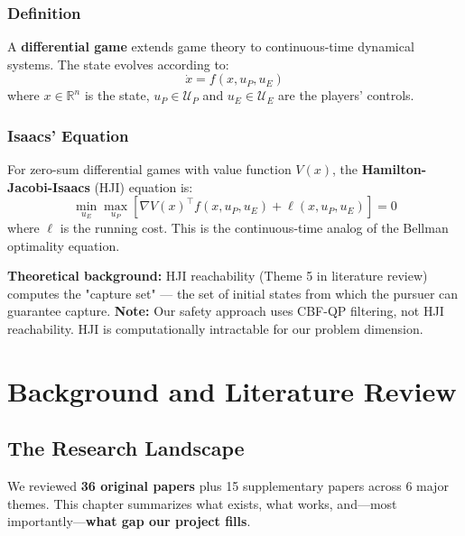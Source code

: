 \documentclass[11pt,a4paper]{report}
\begin{document}
\subsection{Definition}

A \textbf{differential game} extends game theory to continuous-time dynamical systems. The state evolves according to:
\begin{equation}
    \dot{x} = f(x, u_P, u_E)
\end{equation}
where $x \in \mathbb{R}^n$ is the state, $u_P \in \mathcal{U}_P$ and $u_E \in \mathcal{U}_E$ are the players' controls.

\subsection{Isaacs' Equation}

For zero-sum differential games with value function $V(x)$, the \textbf{Hamilton-Jacobi-Isaacs} (HJI) equation is:
\begin{equation}
    \min_{u_E} \max_{u_P} \left[ \nabla V(x)^\top f(x, u_P, u_E) + \ell(x, u_P, u_E) \right] = 0
\end{equation}
where $\ell$ is the running cost. This is the continuous-time analog of the Bellman optimality equation.

\begin{infobox}
\textbf{Theoretical background:} HJI reachability (Theme 5 in literature review) computes the "capture set" --- the set of initial states from which the pursuer can guarantee capture. \textbf{Note:} Our safety approach uses CBF-QP filtering, not HJI reachability. HJI is computationally intractable for our problem dimension.
\end{infobox}

\chapter{Background and Literature Review}
\label{chap:literature}

\section{The Research Landscape}

We reviewed \textbf{36 original papers} plus 15 supplementary papers across 6 major themes. This chapter summarizes what exists, what works, and---most importantly---\textbf{what gap our project fills}.
\end{document}
